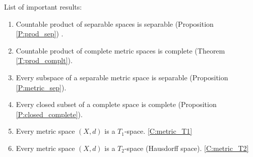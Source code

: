 \newpage
List of important results:
\begin{enumerate}
  \item Countable product of separable spaces is separable (Proposition
	\ref{P:prod_sep}) .
  \item	Countable product of complete metric spaces is complete (Theorem 
	\ref{T:prod_complt}).
  \item Every subspace of a separable metric space is separable (Proposition
	\ref{P:metric_sep}).
  \item Every closed subset of a complete space is complete (Proposition
	\ref{P:closed_complete}).
  \item Every metric space $(X,d)$ is a $T_1$-space. 
        \ref{C:metric_T1}
  \item Every metric space $(X,d)$ is a $T_2$-space (Hausdorff space). 
        \ref{C:metric_T2}
\end{enumerate}




